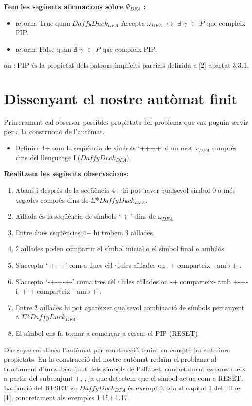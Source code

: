 \documentclass[12pt,a4paper]{report}
\def \dfa{$DaffyDuck_{DFA} $}
\def \alphabetDFA{$\Sigma$*\dfa}
\def \wdfa{$\omega_{DFA} $}
\def \postDFA{$\Psi_{DFA}$}
\def \llesca{$\gamma$}
\begin{document}
\textbf{Fem les següents afirmacions sobre \postDFA{} :}
\begin{itemize}
\item retorna True quan \dfa{} Accepta \wdfa{} $\leftrightarrow$ $\exists$ \llesca{} $\in$ $P$ que compleix PIP.
\item retorna False quan $\nexists$ \llesca{} $\in$ $P$ que compleix PIP.
\end{itemize}
on : PIP és la propietat dels patrons implícits parcials definida a [2] apartat 3.3.1.

\section{Dissenyant el nostre autòmat finit}

Primerament cal observar possibles propietats del problema que ens puguin servir per a la construcció de l’autòmat.

\begin{itemize}
\item Definim 4+ com la seqüència de símbols ‘++++’ d’un mot \wdfa{} comprés dins del llenguatge L(\dfa{}).
\end{itemize}

\textbf{Realitzem les següents observacions:}

\begin{enumerate}
\item Abans i després de la seqüència 4+ hi pot haver qualsevol símbol 0 o més vegades comprés dins de \alphabetDFA{}.
\item Aïllada és la seqüència de símbols ‘-+-’ dins de \wdfa{}
\item Entre dues seqüències 4+ hi trobem 3 aïllades.
\item 2 aïllades poden compartir el símbol inicial o el símbol final o ambdós.
\item S’accepta ‘-+-+-’ com a dues cèl·lules aïllades on -+ comparteix - amb +-.
\item S’accepta ‘-+-+-+-’ coma  tres cèl·lules aïllades on -+ comparteix- amb +-+- i -+-+ comparteix - amb +-.
\item Entre 2 aïllades hi pot aparèixer qualsevol combinació de símbols pertanyent a \alphabetDFA{}.
\item El símbol \Return ens fa tornar a començar a cercar el PIP (RESET).
\end{enumerate}


Dissenyarem doncs l’autòmat per construcció tenint en compte les anteriors propietats. En la construcció del nostre autòmat reduïm el problema al tractament d’un subconjunt dels símbols de l’alfabet, concretament es construeix a partir del subconjunt {+,-}, ja que detectem que el símbol \Return actua com a RESET. La funció del RESET en \dfa{} és exemplificada al capítol 1 del llibre [1], concretament als exemples 1.15 i 1.17.
\end{document}

